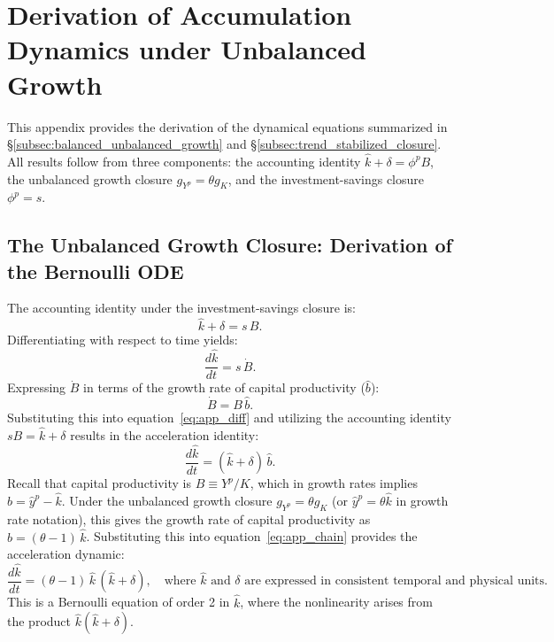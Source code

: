 \section{Derivation of Accumulation Dynamics under Unbalanced Growth}
\label{app:acc_dynamics}

This appendix provides the derivation of the dynamical equations summarized in \S\ref{subsec:balanced_unbalanced_growth} and \S\ref{subsec:trend_stabilized_closure}. All results follow from three components: the accounting identity $\hat{k} + \delta = \phi^p B$, the unbalanced growth closure $g_{Y^p} = \theta g_K$, and the investment-savings closure $\phi^p = s$.

\subsection{The Unbalanced Growth Closure: Derivation of the Bernoulli ODE}
\label{app:bernoulli}

The accounting identity under the investment-savings closure is:
\begin{equation}\label{eq:app_identity}
    \hat{k} + \delta = s \, B.
\end{equation}
Differentiating with respect to time yields:
\begin{equation}\label{eq:app_diff}
    \frac{d\hat{k}}{dt} = s \, \dot{B}.
\end{equation}
Expressing $\dot{B}$ in terms of the growth rate of capital productivity ($\hat{b}$):
\begin{equation}\label{eq:app_Bdot}
    \dot{B} = B \, \hat{b}.
\end{equation}
Substituting this into equation~\eqref{eq:app_diff} and utilizing the accounting identity $sB = \hat{k} + \delta$ results in the acceleration identity:
\begin{equation}\label{eq:app_chain}
    \frac{d\hat{k}}{dt} = (\hat{k} + \delta) \, \hat{b}.
\end{equation}
Recall that capital productivity is $B \equiv Y^p / K$, which in growth rates implies $\hat{b} = \hat{y}^p - \hat{k}$. Under the unbalanced growth closure $g_{Y^p} = \theta g_K$ (or $\hat{y}^p = \theta \hat{k}$ in growth rate notation), this gives the growth rate of capital productivity as $\hat{b} = (\theta - 1) \, \hat{k}$. Substituting this into equation~\eqref{eq:app_chain} provides the acceleration dynamic:
\begin{equation}\label{eq:app_bernoulli}
    \boxed{\frac{d\hat{k}}{dt} = (\theta - 1) \, \hat{k} \, (\hat{k} + \delta)}, \quad \text{where } \hat{k} \text{ and } \delta \text{ are expressed in consistent temporal and physical units}.
\end{equation}
This is a Bernoulli equation of order 2 in $\hat{k}$, where the nonlinearity arises from the product $\hat{k}(\hat{k} + \delta)$.

